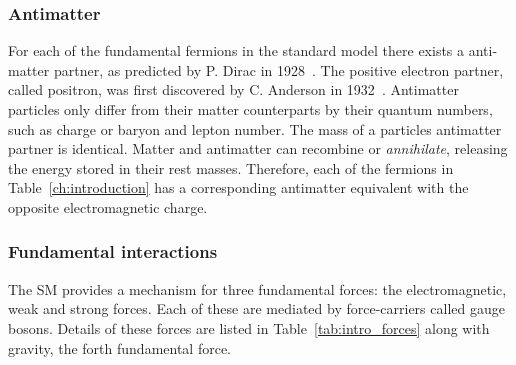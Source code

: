 

\subsubsection{Antimatter}

For each of the fundamental fermions in the standard model there exists a anti-matter partner, as predicted by P. Dirac in 1928~\cite{Dirac610}. The positive electron partner, called positron, was first discovered by C. Anderson in 1932~\cite{PhysRev.43.491}.
Antimatter particles only differ from their matter counterparts by their quantum numbers, such as charge or baryon and lepton number. The mass of a particles antimatter partner is identical. Matter and antimatter can recombine or \emph{annihilate}, releasing the energy stored in their rest masses. 
Therefore, each of the fermions in Table~\ref{ch:introduction} has a corresponding antimatter equivalent with the opposite electromagnetic charge.  

\subsubsection{Fundamental interactions}

The SM provides a mechanism for three fundamental forces: the electromagnetic, weak and strong forces. Each of these are mediated by force-carriers called gauge bosons.
Details of these forces are listed in Table~\ref{tab:intro_forces} along with gravity, the forth fundamental force. 

